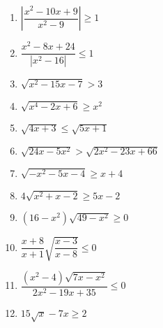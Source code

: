 \documentclass[12pt, a4paper]{article}
\begin{document}
	
	\begin{enumerate}
		\item $\left|\dfrac{x^2-10x+9}{x^2-9}\right|\geq1$
		\item $\dfrac{x^2-8x+24}{|x^2-16|}\leq1$
		\item $\sqrt{x^2-15x-7}>3$
		\item $\sqrt{x^4-2x+6}\geq x^2$
		\item $\sqrt{4x+3}\leq\sqrt{5x+1}$
		\item $\sqrt{24x-5x^2}>\sqrt{2x^2-23x+66}$
		\item $\sqrt{-x^2-5x-4}\geq x+4$
		\item $4\sqrt{x^2+x-2}\geq 5x-2$
		\item $(16-x^2)\sqrt{49-x^2}\geq0$
		\item $\dfrac{x+8}{x+1}\sqrt{\dfrac{x-3}{x-8}}\leq0$
		\item $\dfrac{(x^2-4)\sqrt{7x-x^2}}{2x^2-19x+35}\leq0$
		\item $15\sqrt{x}-7x\geq2$
	\end{enumerate}
\end{document}
